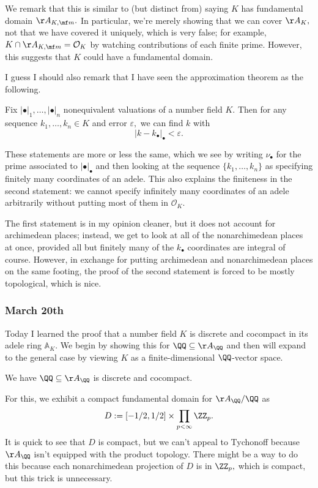 We remark that this is similar to (but distinct from) saying $K$ has fundamental domain $\AA_{K,\mf m}.$ In particular, we're merely showing that we can cover $\AA_K,$ not that we have covered it uniquely, which is very false; for example, $K\cap\AA_{K,\mf m}=\mathcal O_K$ by watching contributions of each finite prime. However, this suggests that $K$ could have a fundamental domain.

I guess I should also remark that I have seen the approximation theorem as the following.
\begin{theorem}
    Fix $|\bullet|_1,\ldots,|\bullet|_n$ nonequivalent valuations of a number field $K.$ Then for any sequence $k_1,\ldots,k_n\in K$ and error $\varepsilon,$ we can find $k$ with
    \[|k-k_\bullet|_\bullet<\varepsilon.\]
\end{theorem}
These statements are more or less the same, which we see by writing $\nu_\bullet$ for the prime associated to $|\bullet|_\bullet$ and then looking at the sequence $\{k_1,\ldots,k_n\}$ as specifying finitely many coordinates of an adele. This also explains the finiteness in the second statement: we cannot specify infinitely many coordinates of an adele arbitrarily without putting most of them in $\mathcal O_K.$

The first statement is in my opinion cleaner, but it does not account for archimedean places; instead, we get to look at all of the nonarchimedean places at once, provided all but finitely many of the $k_\bullet$ coordinates are integral of course. However, in exchange for putting archimedean and nonarchimedean places on the same footing, the proof of the second statement is forced to be mostly topological, which is nice.

\subsubsection{March 20th}
Today I learned the proof that a number field $K$ is discrete and cocompact in its adele ring $\mathbb A_K.$ We begin by showing this for $\QQ\subseteq\AA_\QQ$ and then will expand to the general case by viewing $K$ as a finite-dimensional $\QQ$-vector space.
\begin{proposition}
    We have $\QQ\subseteq\AA_\QQ$ is discrete and cocompact.
\end{proposition}
For this, we exhibit a compact fundamental domain for $\AA_\QQ/\QQ$ as
\[D:=[-1/2,1/2]\times\prod_{p<\infty}\ZZ_p.\]
It is quick to see that $D$ is compact, but we can't appeal to Tychonoff because $\AA_\QQ$ isn't equipped with the product topology. There might be a way to do this because each nonarchimedean projection of $D$ is in $\ZZ_p,$ which is compact, but this trick is unnecessary.

